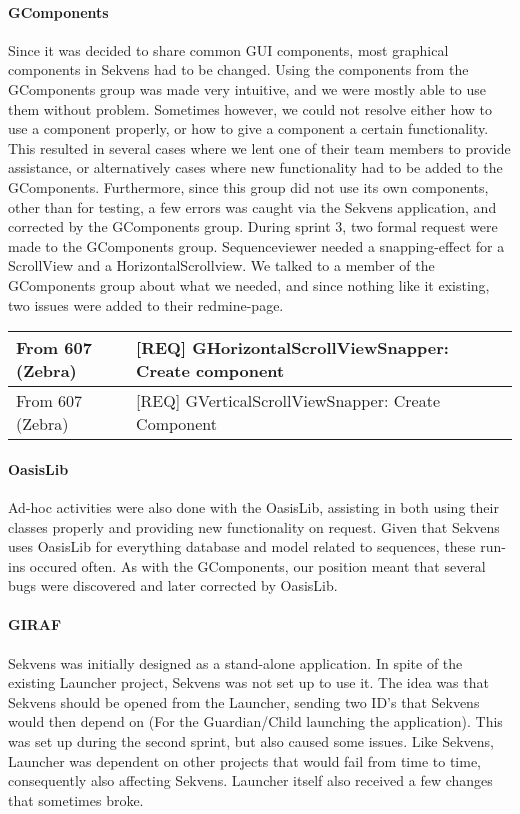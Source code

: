 \paragraph{GComponents}
Since it was decided to share common GUI components, most graphical components in Sekvens had to be changed. Using the components from the GComponents group was made very intuitive, and we were mostly able to use them without problem. Sometimes however, we could not resolve either how to use a component properly, or how to give a component a certain functionality. This resulted in several cases where we lent one of their team members to provide assistance, or alternatively cases where new functionality had to be added to the GComponents.  Furthermore, since this group did not use its own components, other than for testing, a few errors was caught via the Sekvens application, and corrected by the GComponents group.\newline
\newline
\label{collaborationSnapper}During sprint 3, two formal request were made to the GComponents group. Sequenceviewer needed a snapping-effect for a ScrollView and a HorizontalScrollview. We talked to a member of the GComponents group about what we needed, and since nothing like it existing, two issues were added to their redmine-page. \newline

\begin{tabular}{| l | l |}
  \hline                       
[REQUEST] From 607 (Zebra) & [REQ] GHorizontalScrollViewSnapper: Create component \\ \hline
[REQUEST] From 607 (Zebra) & [REQ] GVerticalScrollViewSnapper: Create Component \\
  \hline  
\end{tabular}

\paragraph{OasisLib}
Ad-hoc activities were also done with the OasisLib, assisting in both using their classes properly and providing new functionality on request. Given that Sekvens uses OasisLib for everything database and model related to sequences, these run-ins occured often. As with the GComponents, our position meant that several bugs were discovered and later corrected by OasisLib.

\paragraph{GIRAF}
Sekvens was initially designed as a stand-alone application. In spite of the existing Launcher project, Sekvens was not set up to use it. The idea was that Sekvens should be opened from the Launcher, sending two ID's that Sekvens would then depend on (For the Guardian/Child launching the application). This was set up during the second sprint, but also caused some issues. Like Sekvens, Launcher was dependent on other projects that would fail from time to time, consequently also affecting Sekvens. Launcher itself also received a few changes that sometimes broke.

